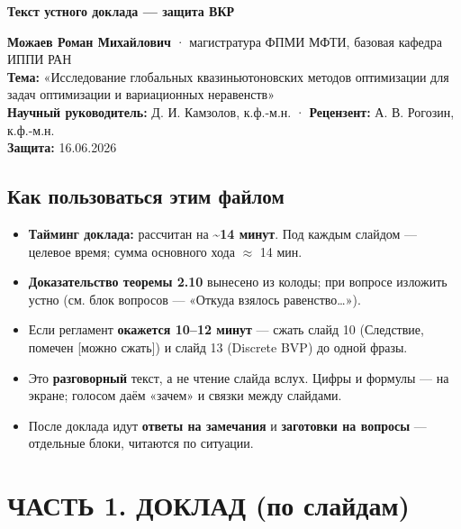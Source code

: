 \documentclass[12pt]{article}
\begin{document}
\begin{center}{\LARGE\bfseries\color{headcol} Текст устного доклада — защита ВКР}\end{center}\vspace{0.4em}

\begin{center}\textbf{Можаев Роман Михайлович} · магистратура ФПМИ МФТИ, базовая кафедра ИППИ РАН \\ \textbf{Тема:} «Исследование глобальных квазиньютоновских методов оптимизации для задач оптимизации и вариационных неравенств» \\ \textbf{Научный руководитель:} Д. И. Камзолов, к.ф.-м.н. · \textbf{Рецензент:} А. В. Рогозин, к.ф.-м.н. \\ \textbf{Защита:} 16.06.2026\end{center}

\medskip\noindent{\color{rulecol}\rule{\linewidth}{0.4pt}}\par\medskip

\subsection*{\color{headcol} Как пользоваться этим файлом}

\begin{itemize}\setlength{\itemsep}{0.2em}
\item \textbf{Тайминг доклада:} рассчитан на \textbf{\textasciitilde{}14 минут}. Под каждым слайдом — целевое время; сумма основного хода \ensuremath{\approx} 14 мин.
\item \textbf{Доказательство теоремы 2.10} вынесено из колоды; при вопросе изложить устно (см. блок вопросов — «Откуда взялось равенство…»).
\item Если регламент \textbf{окажется 10–12 минут} — сжать слайд 10 (Следствие, помечен {\ttfamily\small\color{rulecol}[можно сжать]}) и слайд 13 (Discrete BVP) до одной фразы.
\item Это \textbf{разговорный} текст, а не чтение слайда вслух. Цифры и формулы — на экране; голосом даём «зачем» и связки между слайдами.
\item После доклада идут \textbf{ответы на замечания} и \textbf{заготовки на вопросы} — отдельные блоки, читаются по ситуации.
\end{itemize}

\medskip\noindent{\color{rulecol}\rule{\linewidth}{0.4pt}}\par\medskip

\section*{\color{headcol} ЧАСТЬ 1. ДОКЛАД (по слайдам)}
\end{document}
